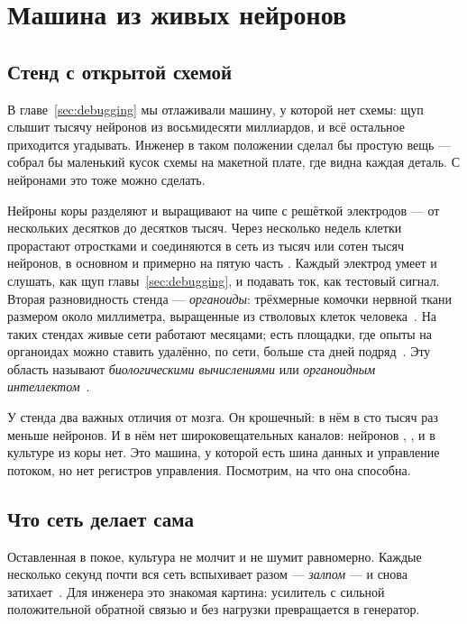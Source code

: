 \chapter{Машина из живых нейронов}
\label{sec:livingmachine}

\section{Стенд с открытой схемой}

В главе~\ref{sec:debugging} мы отлаживали машину, у которой нет схемы: щуп слышит тысячу нейронов из восьмидесяти миллиардов, и всё остальное приходится угадывать. Инженер в таком положении сделал бы простую вещь --- собрал бы маленький кусок схемы на макетной плате, где видна каждая деталь. С нейронами это тоже можно сделать.

Нейроны коры разделяют и выращивают на чипе с решёткой электродов --- от нескольких десятков до десятков тысяч. Через несколько недель клетки прорастают отростками и соединяются в сеть из тысяч или сотен тысяч нейронов, в основном  и примерно на пятую часть . Каждый электрод умеет и слушать, как щуп главы~\ref{sec:debugging}, и подавать ток, как тестовый сигнал. Вторая разновидность стенда --- \emph{органоиды}: трёхмерные комочки нервной ткани размером около миллиметра, выращенные из стволовых клеток человека~\cite{Lancaster2013}. На таких стендах живые сети работают месяцами; есть площадки, где опыты на органоидах можно ставить удалённо, по сети, больше ста дней подряд~\cite{Jordan2024}. Эту область называют \emph{биологическими вычислениями} или \emph{органоидным интеллектом}~\cite{Smirnova2023}.

У стенда два важных отличия от мозга. Он крошечный: в нём в сто тысяч раз меньше нейронов. И в нём нет широковещательных каналов: нейронов , ,  и  в культуре из коры нет. Это машина, у которой есть шина данных и управление потоком, но нет регистров управления. Посмотрим, на что она способна.

\section{Что сеть делает сама}

Оставленная в покое, культура не молчит и не шумит равномерно. Каждые несколько секунд почти вся сеть вспыхивает разом --- \emph{залпом} --- и снова затихает~\cite{Wagenaar2006}. Для инженера это знакомая картина: усилитель с сильной положительной обратной связью и без нагрузки превращается в генератор.

